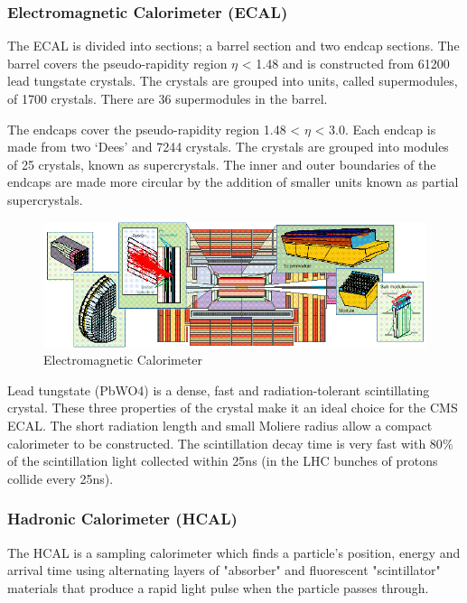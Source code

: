 \subsubsection{Electromagnetic Calorimeter (ECAL)}

The ECAL is divided into sections; a barrel section and two endcap sections. The barrel covers the pseudo-rapidity region $\eta$ < 1.48 and is constructed from 61200 lead tungstate crystals. The
crystals are grouped into units, called supermodules, of 1700 crystals. There are 36 supermodules in the barrel.

The endcaps cover the pseudo-rapidity region 1.48 < $\eta$ < 3.0. Each endcap is made from two ‘Dees’ and 7244 crystals. The crystals are grouped into modules of 25 crystals, known as supercrystals. The inner and outer boundaries of the endcaps are made more circular by the addition of smaller units known as partial supercrystals.

\begin{figure}[H]
  \centering
\includegraphics[width=14cm]{CMS_chapter_plots/caloc}
  \caption{Electromagnetic Calorimeter \label{fig:caloc}}
\end{figure}
\noindent
Lead tungstate (PbWO4) is a dense, fast and radiation-tolerant scintillating crystal. These three properties of the crystal make it an ideal choice for the CMS ECAL. The short radiation length and small Moliere radius allow a compact calorimeter to be constructed. The scintillation decay time is very fast with 80$\%$ of the scintillation light collected within 25ns (in the LHC bunches of protons collide every 25ns). 

\subsubsection{Hadronic Calorimeter (HCAL)}

The HCAL \cite{HCAL} is a sampling calorimeter which finds a particle’s position, energy and arrival time using alternating	 layers of "absorber" and fluorescent "scintillator" materials that produce a rapid light pulse when the particle passes through.

